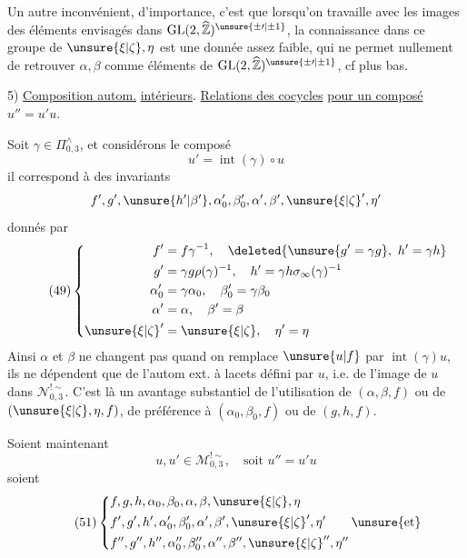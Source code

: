 Un autre \inserted{[!]} inconvénient, d'importance, c'est que lorsqu'on travaille avec les images des éléments envisagés dans $\mathrm{GL}(2,\widehat{\mathbb Z})^{\unsure{\pm\prime|\pm1}}$, la connaissance dans ce groupe de $\unsure{\xi|\zeta},\eta$  est  une donnée assez faible, qui ne permet nullement de retrouver $\alpha,\beta$ comme éléments de $\mathrm{GL}(2,\widehat{\mathbb Z})^{\unsure{\pm\prime|\pm1}}$, cf plus bas.


5) \uline{Composition  autom.} \uline{intérieurs}. \uline{Relations des cocycles} \uline{pour un composé} $u''=u'u$.

Soit $\gamma\in\Pi_{0,3}^{\wedge}$, et considérons le composé
\[
\tag{48}
u'=\operatorname{int}(\gamma)\circ u
\]
il correspond à des invariants
\[
f',g',\unsure{h'|\beta'},\alpha_0',\beta_0',\alpha',\beta',\unsure{\xi|\zeta}',\eta'
\]
donnés par
\[
\tag{49}
\left\{\begin{aligned}
f'&=f\gamma^{-1},\quad\deleted{\unsure{g'=\gamma g},\ h'=\gamma h}\\
g'&=\gamma g\rho(\gamma)^{-1},\quad h'=\gamma h\sigma_\infty(\gamma)^{-1}\\
\alpha_0'&=\gamma\alpha_0,\quad\beta_0'=\gamma\beta_0\\
\alpha'&=\alpha,\quad\beta'=\beta\\
\unsure{\xi|\zeta}'&=\unsure{\xi|\zeta},\quad\eta'=\eta
\end{aligned}\right.
\]
Ainsi $\alpha$ et $\beta$ ne changent pas quand on remplace $\unsure{u|f}$ par $\operatorname{int}(\gamma)u$, ils ne dépendent que de l'autom ext. à lacets défini par $u$, i.e. de l'image de $u$ dans $\mathcal{N}_{0,3}^{!\sim}$. C'est là un avantage substantiel de l'utilisation de $(\alpha,\beta,f)$ ou de $(\unsure{\xi|\zeta},\eta,f)$, de préférence à $(\alpha_0,\beta_0,f)$ ou de $(g,h,f)$.

Soient maintenant
\[
\tag{50}
u,u'\in\mathcal{M}_{0,3}^{!\sim},\quad\text{soit }u''=u'u
\]
soient
\[
\tag{51}
\left\{\begin{aligned}
&f,g,h,\alpha_0,\beta_0,\alpha,\beta,\unsure{\xi|\zeta},\eta\\
&f',g',h',\alpha_0',\beta_0',\alpha',\beta',\unsure{\xi|\zeta}',\eta'\qquad\unsure{\text{et}}\\
&f'',g'',h'',\alpha_0'',\beta_0'',\alpha'',\beta'',\unsure{\xi|\zeta}'',\eta''
\end{aligned}\right.
\]

